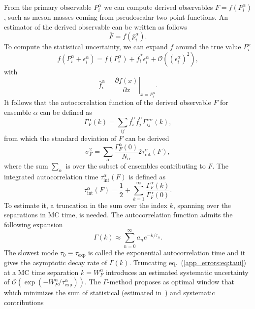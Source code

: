 From the primary observable $P_i^{\alpha}$ we can compute derived observables $F=f(P_i^{\alpha})$, such as meson masses coming from pseudoscalar two point functions. An estimator of the derived observable can be written as follows
\begin{equation}
\bar{F}=f(\bar{p}_i^{\alpha}).
\end{equation}
To compute the statistical uncertainty, we can expand $f$ around the true value $P_i^{\alpha}$
\begin{equation}
f(P_{i}^{\alpha}+\epsilon_{i}^{\alpha})=f(P_{i}^{\alpha})+\bar{f}_i^{\alpha}\epsilon_{i}^{\alpha}+\mathcal{O}((\epsilon_{i}^{\alpha})^2),
\end{equation}
with
\begin{equation}
\bar{f}_i^{\alpha}=\left.\frac{\partial f(x)}{\partial x}\right|_{x=P_{i}^{\alpha}}.
\end{equation}
It follows that the autocorrelation function of the derived observable $F$ for ensemble $\alpha$ can be defined as
\begin{equation}
\Gamma_F^{\alpha}(k)=\sum_{ij}\bar{f}_i^{\alpha}\bar{f}_j^{\alpha}\Gamma_{ij}^{\alpha\alpha}(k),
\end{equation}
from which the standard deviation of $F$ can be derived
\begin{equation}
\sigma_F^2=\sum_{\alpha}\frac{\Gamma_F^{\alpha}(0)}{N_{\alpha}}2\tau_{\textrm{int}}^{\alpha}(F),
\end{equation}
where the sum $\sum_{\alpha}$ is over the subset of ensembles contributing to $F$. The integrated autocorrelation time $\tau_{\textrm{int}}^{\alpha}(F)$ is defined as
\begin{equation}
\label{app_errors:eq:taui}
\tau_{\textrm{int}}^{\alpha}(F)=\frac{1}{2}+\sum_{k=1}^{\infty}\frac{\Gamma_F^{\alpha}(k)}{\Gamma_F^{\alpha}(0)}.
\end{equation}
To estimate it, a truncation in the sum over the index $k$, spanning over the separations in MC time, is needed. The autocorrelation function admits the following expansion~\citep{Luscher:2011kk,Schaefer:2010hu}
\begin{equation}
\Gamma(k)\approx\sum_{n=0}^{\infty}a_ne^{-k/\tau_n}.
\end{equation}
The slowest mode $\tau_0\equiv\tau_{\textrm{exp}}$ is called the exponential autocorrelation time and it gives the asymptotic decay rate of $\Gamma(k)$. Truncating eq.~(\ref{app_errors:eq:taui}) at a MC time separation $k=W_F^{\alpha}$ introduces an estimated systematic uncertainty of $\mathcal{O}(\exp(-W_F^{\alpha}/\tau_{\textrm{exp}}^{\alpha}))$. The $\Gamma$-method proposes as optimal window that which minimizes the sum of statistical (estimated in~\citep{Madras:1988ei}) and systematic contributions
